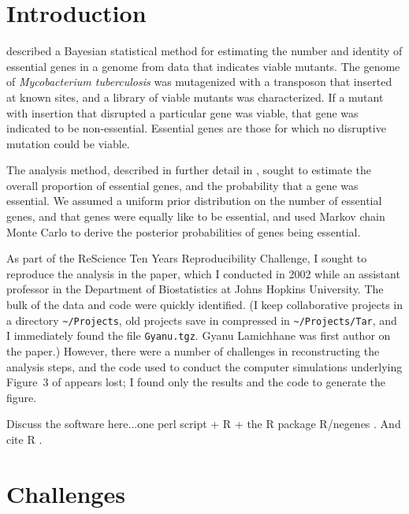 \setlength{\parskip}{0.5\baselineskip}

\begin{quote}
\small
\articleABSTRACT
\end{quote}


\section{Introduction}

\citet{lamichhane2003} described a Bayesian statistical method for
estimating the number and identity of essential genes in a genome from
data that indicates viable mutants. The genome of \emph{Mycobacterium
tuberculosis\/} was mutagenized with a transposon that inserted at
known sites, and a library of viable mutants was characterized. If a
mutant with insertion that disrupted a particular gene was viable,
that gene was indicated to be non-essential. Essential genes are those
for which no disruptive mutation could be viable.

The analysis method, described in further detail in
\citet{blades2002}, sought to estimate the overall proportion of
essential genes, and the probability that a gene was essential. We
assumed a uniform prior distribution on the number of essential genes,
and that genes were equally like to be essential, and used Markov
chain Monte Carlo to derive the posterior probabilities of genes being
essential.

As part of the ReScience Ten Years Reproducibility Challenge, I sought
to reproduce the analysis in the paper, which I conducted in 2002
while an assistant professor in the Department of Biostatistics at
Johns Hopkins University. The bulk of the data and code were quickly
identified. (I keep collaborative projects in a directory
\verb|~/Projects|, old projects save in compressed in
\verb|~/Projects/Tar|, and I immediately found
the file \verb|Gyanu.tgz|. Gyanu Lamichhane was first author on the
paper.) However, there were a number of challenges in reconstructing
the analysis steps, and the code used to conduct the computer
simulations underlying Figure~3 of \citet{lamichhane2003} appears
lost; I found only the results and the code to generate the figure.

Discuss the software here...one perl script + R + the R package
R/negenes \citep{negenes}. And cite R \citep{R}.

\section{Challenges}

